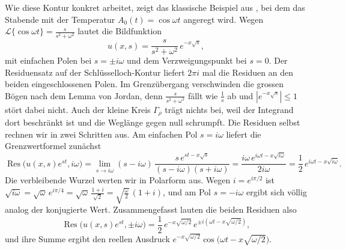 

Wie diese Kontur konkret arbeitet, zeigt das klassische Beispiel aus
\cite{laplace:doetsch1961}, bei dem das Stabende mit der Temperatur
$A_0(t) = \cos \omega t$ angeregt wird.
Wegen $\mathcal{L}\{\cos \omega t\} = \frac{s}{s^2 + \omega^2}$ lautet die
Bildfunktion
\begin{equation}
    u(x,s)
    =
    \frac{s}{s^2 + \omega^2} \, e^{-x\sqrt{s}},
    \label{laplace:eq:keyhole_beispiel}
\end{equation}
mit einfachen Polen bei $s = \pm i\omega$ und dem Verzweigungspunkt bei
$s = 0$.
Der Residuensatz auf der Schlüsselloch-Kontur liefert $2\pi i$ mal die
Residuen an den beiden eingeschlossenen Polen.
Im Grenzübergang verschwinden die grossen Bögen nach dem Lemma von Jordan,
denn $\frac{s}{s^2+\omega^2}$ fällt wie $\frac{1}{s}$ ab und
$|e^{-x\sqrt{s}}| \leq 1$ stört dabei nicht.
Auch der kleine Kreis $\Gamma_\rho$ trägt nichts bei, weil der Integrand
dort beschränkt ist und die Weglänge gegen null schrumpft.
Die Residuen selbst rechnen wir in zwei Schritten aus.
Am einfachen Pol $s = i\omega$ liefert die Grenzwertformel zunächst
\begin{equation}
    \operatorname{Res}\bigl(u(x,s)e^{st}, i\omega\bigr)
    =
    \lim_{s \to i\omega}
    (s - i\omega) \,
    \frac{s \, e^{st - x\sqrt{s}}}{(s - i\omega)(s + i\omega)}
    =
    \frac{i\omega \, e^{i\omega t - x\sqrt{i\omega}}}{2 i\omega}
    =
    \frac{1}{2} \, e^{i\omega t - x\sqrt{i\omega}}.
    \label{laplace:eq:keyhole_grenzwert}
\end{equation}
Die verbleibende Wurzel werten wir in Polarform aus.
Wegen $i = e^{i\pi/2}$ ist
$\sqrt{i\omega}
= \sqrt{\omega} \, e^{i\pi/4}
= \sqrt{\omega} \, \frac{1 + i}{\sqrt{2}}
= \sqrt{\tfrac{\omega}{2}} \, (1 + i)$,
und am Pol $s = -i\omega$ ergibt sich völlig analog der konjugierte
Wert.
Zusammengefasst lauten die beiden Residuen also
\begin{equation}
    \operatorname{Res}\bigl(u(x,s)e^{st}, \pm i\omega\bigr)
    =
    \frac{1}{2} \,
    e^{-x\sqrt{\omega/2}} \,
    e^{\pm i\left(\omega t - x\sqrt{\omega/2}\right)},
    \label{laplace:eq:keyhole_residuen}
\end{equation}
und ihre Summe ergibt den reellen Ausdruck
$e^{-x\sqrt{\omega/2}} \cos\bigl(\omega t - x\sqrt{\omega/2}\bigr)$.

